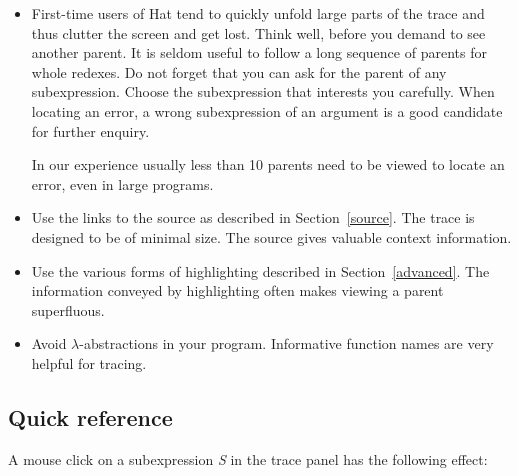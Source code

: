 \documentclass[12pt]{article}
\begin{document}
\begin{itemize}
\item First-time users of Hat tend to quickly unfold large parts of the trace and thus clutter the screen and get lost. Think well, before you demand to see another parent. It is seldom useful to follow a long sequence of parents for whole redexes. Do not forget that you can ask for the parent of any subexpression. Choose the subexpression that interests you carefully. When locating an error, a wrong subexpression of an argument is a good candidate for further enquiry.

In our experience usually less than 10 parents need to be viewed to locate an error, even in large programs.

\item Use the links to the source as described in Section~\ref{source}. The trace is designed to be of minimal size. The source gives valuable context information.

\item Use the various forms of highlighting described in Section~\ref{advanced}. The information conveyed by highlighting often makes viewing a parent superfluous.

\item Avoid $\lambda$-abstractions in your program. Informative function names are very helpful for tracing.

\end{itemize}



\subsection{Quick reference}


A mouse click on a subexpression \emph{S} in the trace panel has the following effect:
\end{document}
